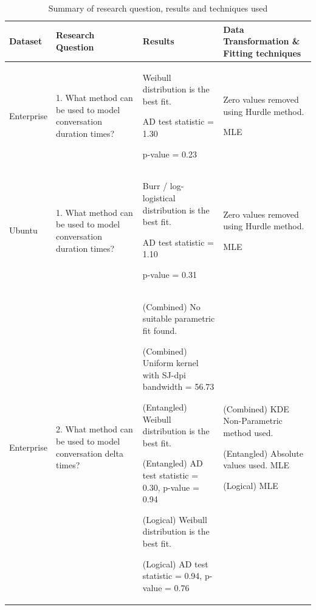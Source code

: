 \begin{table}
\begin{flushleft}
\caption {Summary of research question, results and techniques used}
\label{tab:chapt6tab2}
\begin{tabular}{| L{1.9cm} | C{4cm} | C{9.5cm} | C{5cm} |} \hline 
\textbf{Dataset} & \textbf{Research Question} & \textbf{Results} & \textbf{Data Transformation \& Fitting techniques} 
\\ \hline Enterprise & 1. What method can be used to model conversation duration times? & Weibull distribution is the best fit. \par AD test statistic = 1.30 \par p-value = 0.23 & Zero values removed using Hurdle method. \cite {mullahy1986specification} \par MLE \cite{fisher1925theory} \cite {wilks1938large}

\\ \hline Ubuntu & 1. What method can be used to model conversation duration times? & Burr / log-logistical distribution is the best fit. \par AD test statistic = 1.10 \par p-value = 0.31  & Zero values removed using Hurdle method. \cite {mullahy1986specification} \par MLE \cite{fisher1925theory} \cite {wilks1938large}


\\ \hline Enterprise & 2. What method can be used to model conversation delta times? & 
(Combined) No suitable parametric fit found. 
\par (Combined)  Uniform kernel with SJ-dpi bandwidth = 56.73
\par (Entangled)  Weibull distribution is the best fit.
\par (Entangled) AD test statistic = 0.30, p-value = 0.94
\par (Logical)  Weibull distribution is the best fit.
\par (Logical) AD test statistic = 0.94, p-value = 0.76
& 
(Combined) KDE Non-Parametric method used. \cite{rosenblatt1956remarks}\cite{parzen1962estimation}
\cite{sheather1991reliable} 
\par (Entangled) Absolute values used. MLE \cite{fisher1925theory} \cite {wilks1938large}
\par (Logical) MLE \cite{fisher1925theory} \cite {wilks1938large}
\\ \hline 
 \end{tabular}
\end{flushleft}
\end{table}

